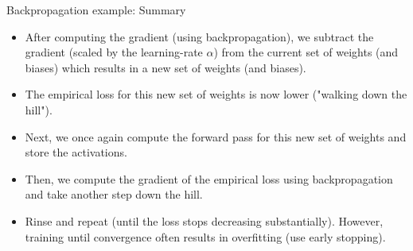 \begin{frame} {Backpropagation example: Summary}
  \begin{itemize}
    \item After computing the gradient (using backpropagation), we subtract the gradient (scaled by the learning-rate $\alpha$) from the current set of weights (and biases) which results in a new set of weights (and biases).
    \item The empirical loss for this new set of weights is now lower ("walking down the hill").
    \item Next, we once again compute the forward pass for this new set of weights and store the activations.
    \item Then, we compute the gradient of the empirical loss using backpropagation and take another step down the hill.
    \item Rinse and repeat (until the loss stops decreasing substantially). 
      However, training until convergence often results in overfitting (use early stopping).
  \end{itemize}
\end{frame}

\endlecture
